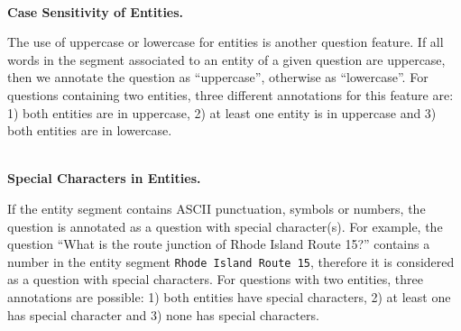 \documentclass[sigconf,edbt]{acmart-edbt2019}
\newcommand{\qq}[1]{``#1''}
\begin{document}
~\\
{\bf Case Sensitivity of Entities.} \begin{inparaenum}
The use of uppercase or lowercase for entities is another question feature. If all words in the segment associated to an entity of a given question are uppercase, then we annotate the question as ``uppercase'', otherwise as ``lowercase''. For questions containing two entities, three different annotations for this feature are: 1) both entities are in uppercase, 2) at least one entity is in uppercase and 3) both entities are in lowercase.
\end{inparaenum}
~\\
{\bf Special Characters in Entities.} \begin{inparaenum}
If the entity segment contains ASCII punctuation, symbols or numbers, the question is annotated as a question with special character(s). For example, the question \qq{What is the route junction of Rhode Island Route 15?} contains a number in the entity segment \texttt{Rhode Island Route 15}, therefore it is considered as a question with special characters. For questions with two entities, three annotations are possible: 1) both entities have special characters, 2) at least one has special character and 3) none has special characters.
\end{inparaenum}
\end{document}
